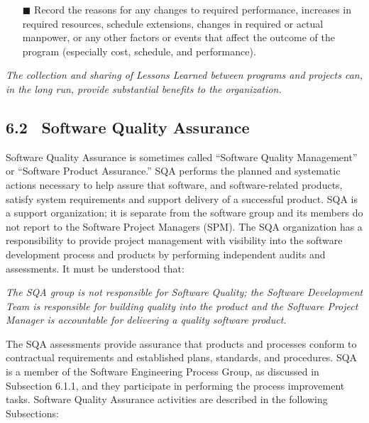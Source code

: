 \documentclass[10pt,twocolumn]{article}
\begin{document}
\begin{itemize}

	
	\item [$\blacksquare$]
	Record the reasons for any changes to required performance, increases in required resources, schedule extensions, changes in required or actual manpower, or any
	other factors or events that affect the outcome of the
	program (especially cost, schedule, and performance).
\end{itemize}

\vspace{0.35cm}
\begin{minipage}[right]{.4\textwidth}
	\textit{The collection and sharing of Lessons Learned
		between programs and projects can, in the long run,
		provide substantial benefits to the organization.}
\end{minipage}
\vspace{0.35cm}


\subsection*{6.2 $\,$ Software Quality Assurance}
Software Quality Assurance is sometimes called “Software
Quality Management” or “Software Product Assurance.”
SQA performs the planned and systematic actions necessary to help assure that software, and software-related products, satisfy system requirements and support delivery of a
successful product. SQA is a support organization; it is separate from the software group and its members do not report
to the Software Project Managers (SPM). The SQA organization has a responsibility to provide project management with
visibility into the software development process and products
by performing independent audits and assessments. It must
be understood that:

\vspace{0.5cm}
\begin{minipage}[right]{.4\textwidth}
\textit{The SQA group is not responsible for Software
	Quality; the Software Development Team is
	responsible for building quality into the product
	and the Software Project Manager is accountable
	for delivering a quality software product.}
\end{minipage}
\vspace{0.5cm}	



The SQA assessments provide assurance that products
and processes conform to contractual requirements and
established plans, standards, and procedures. SQA is a member of the Software Engineering Process Group, as discussed
in Subsection 6.1.1, and they participate in performing the
process improvement tasks. Software Quality Assurance
activities are described in the following Subsections:
\end{document}
